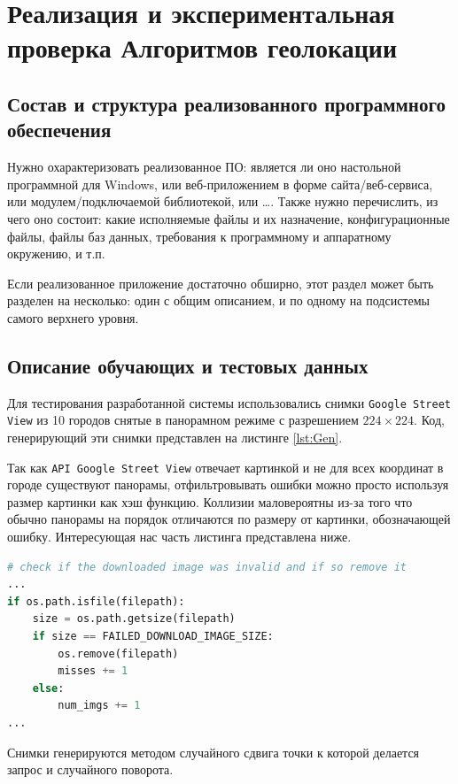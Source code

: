 \chapter{Реализация и экспериментальная проверка Алгоритмов геолокации}

\section{Состав и структура реализованного программного обеспечения}

Нужно охарактеризовать реализованное ПО: является ли оно настольной программной для Windows, или веб-приложением в форме сайта/веб-сервиса, или модулем/подключаемой библиотекой, или \dots. Также нужно перечислить, из чего оно состоит: какие исполняемые файлы и их назначение, конфигурационные файлы, файлы баз данных, требования к программному и аппаратному окружению, и т.п.

Если реализованное приложение достаточно обширно, этот раздел может быть
разделен на несколько: один с общим описанием, и по одному на подсистемы самого
верхнего уровня.

\section{Описание обучающих и тестовых данных}

Для тестирования разработанной системы использовались снимки \texttt{Google Street View} из 10 городов снятые в панорамном режиме с разрешением $ 224\times224 $. Код, генерирующий эти снимки представлен на листинге \ref{lst:Gen}.

Так как \texttt{API Google Street View} отвечает картинкой и не для всех координат в городе существуют панорамы, отфильтровывать ошибки можно просто используя размер картинки
как хэш функцию. Коллизии маловероятны из-за того что обычно панорамы на порядок отличаются по размеру от картинки, обозначающей ошибку. Интересующая нас часть листинга представлена ниже.

\begin{lstlisting}[language=python, float=tb,frame=lines,label=lst:frag1]
# check if the downloaded image was invalid and if so remove it
...
if os.path.isfile(filepath):
	size = os.path.getsize(filepath)
	if size == FAILED_DOWNLOAD_IMAGE_SIZE:
		os.remove(filepath)
		misses += 1
	else:
		num_imgs += 1
...
\end{lstlisting}

Снимки генерируются методом случайного сдвига точки к которой делается запрос и случайного поворота.


